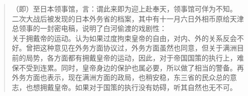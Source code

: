 \begin{quote}
	（即）至日本领事馆，言：谓此来即为迎上赴奉天，领事馆可佯为不知。\\

二次大战后被发现的日本外务省的档案，其中有十一月六日外相币原给天津总领事的一封密电稿，说明了白河偷渡的戏剧性：\\

关于拥戴帝的运动。认为如果过度拘束皇帝的自由，对内、外的关系反会不好。曾把这种意见在外务方面协议过，外务方面虽然也同意，但关于满洲目前的局势，各方面都有拥戴皇帝的运动，因此，对于帝国国策的执行上，难保不受到连累。同时，皇帝身边的保护也属必要，所以做了相当的警备。再外务方面也表示，现在满洲方面的政局，也稍安稳，东三省的民众总的意志，也想拥戴皇帝。如果对于国策的执行没有妨碍，听其自然也无不可。\\
\end{quote}
